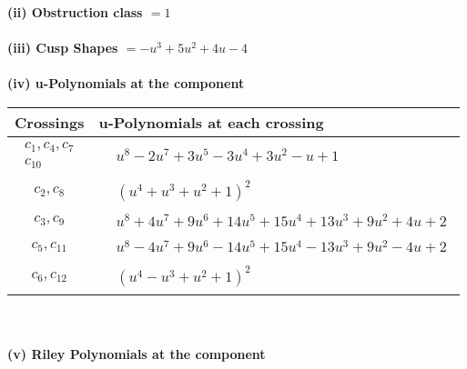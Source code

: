 \documentclass[1p]{elsarticle_modified}
\theoremstyle{definition}
\begin{document}
\flushleft \textbf{(ii) Obstruction class $= 1$}\\~\\
\flushleft \textbf{(iii) Cusp Shapes $= - u^3+5 u^2+4 u-4$}\\~\\
\newpage\renewcommand{\arraystretch}{1}
\flushleft \textbf{(iv) u-Polynomials at the component}\newline \\
\begin{tabular}{m{50pt}|m{274pt}}
Crossings & \hspace{64pt}u-Polynomials at each crossing \\
\hline $$\begin{aligned}c_{1},c_{4},c_{7}\\c_{10}\end{aligned}$$&$\begin{aligned}
&u^8-2 u^7+3 u^5-3 u^4+3 u^2- u+1
\end{aligned}$\\
\hline $$\begin{aligned}c_{2},c_{8}\end{aligned}$$&$\begin{aligned}
&(u^4+u^3+u^2+1)^2
\end{aligned}$\\
\hline $$\begin{aligned}c_{3},c_{9}\end{aligned}$$&$\begin{aligned}
&u^8+4 u^7+9 u^6+14 u^5+15 u^4+13 u^3+9 u^2+4 u+2
\end{aligned}$\\
\hline $$\begin{aligned}c_{5},c_{11}\end{aligned}$$&$\begin{aligned}
&u^8-4 u^7+9 u^6-14 u^5+15 u^4-13 u^3+9 u^2-4 u+2
\end{aligned}$\\
\hline $$\begin{aligned}c_{6},c_{12}\end{aligned}$$&$\begin{aligned}
&(u^4- u^3+u^2+1)^2
\end{aligned}$\\
\hline
\end{tabular}\\~\\
\newpage\renewcommand{\arraystretch}{1}
\flushleft \textbf{(v) Riley Polynomials at the component}\newline \\
\end{document}
